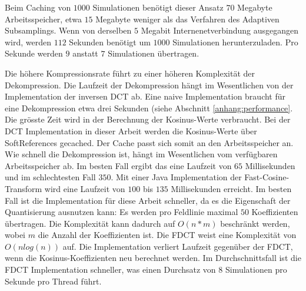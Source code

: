 Beim Caching von $1000$ Simulationen benötigt dieser Ansatz $70$ Megabyte Arbeitsspeicher, etwa $15$ Megabyte weniger als das Verfahren des Adaptiven Subsamplings. Wenn von derselben $5$ Megabit Internenetverbindung ausgegangen wird, werden $112$ Sekunden benötigt um $1000$ Simulationen herunterzuladen. Pro Sekunde werden $9$ anstatt $7$ Simulationen übertragen.

Die höhere Kompressionsrate führt zu einer höheren Komplexität der Dekompression. Die Laufzeit der Dekompression hängt im Wesentlichen von der Implementation der inversen DCT ab. Eine naive Implementation braucht für eine Dekompression etwa drei Sekunden (siehe Abschnitt \ref{anhang:performance}. Die grösste Zeit wird in der Berechnung der Kosinus-Werte verbraucht. Bei der DCT Implementation in dieser Arbeit werden die Kosinus-Werte über SoftReferences gecached. Der Cache passt sich somit an den Arbeitsspeicher an. Wie schnell die Dekompression ist, hängt im Wesentlichen vom verfügbaren Arbeitsspeicher ab. Im besten Fall ergibt das eine Laufzeit von $65$ Millisekunden und im schlechtesten Fall $350$. Mit einer Java Implementation der Fast-Cosine-Transform wird eine Laufzeit von $100$ bis $135$ Millisekunden erreicht. Im besten Fall ist die Implementation für diese Arbeit schneller, da es die Eigenschaft der Quantisierung ausnutzen kann: Es werden pro Feldlinie maximal $50$ Koeffizienten übertragen. Die Komplexität kann dadurch auf $O(n*m)$ beschränkt werden, wobei $m$ die Anzahl der Koeffizienten ist. Die FDCT weist eine Komplexität von $O(n log(n))$ auf. Die Implementation verliert Laufzeit gegenüber der FDCT, wenn die Kosinus-Koeffizienten neu berechnet werden. Im Durchschnittsfall ist die FDCT Implementation schneller, was einen Durchsatz von $8$ Simulationen pro Sekunde pro Thread führt.\\
